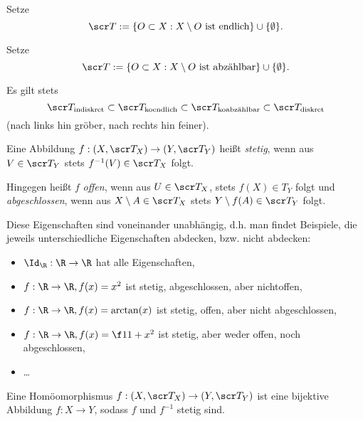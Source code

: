 \begin{ex}
	Setze
	\[
		\scr T
		:= \{ O \subset X : X \setminus O \text{ ist endlich} \} \cup \{\emptyset\}.
	\]
\end{ex}

\begin{ex}
	Setze
	\[
		\scr T
		:= \{ O \subset X : X \setminus O \text{ ist abzählbar} \} \cup \{ \emptyset \}.
	\]
\end{ex}

\begin{nt}
	Es gilt stets
	\[
		\scr T_{\text{indiskret}}
		\subset \scr T_{\text{koendlich}}
		\subset \scr T_{\text{koabzählbar}}
		\subset \scr T_{\text{diskret}}
	\]
	(nach links hin gröber, nach rechts hin feiner).
\end{nt}

\begin{df}
	Eine Abbildung $f: (X,\scr T_X) \to (Y, \scr T_Y)$ heißt \emph{stetig}, wenn aus $V \in \scr T_Y$ stets $f^{-1}(V) \in \scr T_X$ folgt.

	Hingegen heißt $f$ \emph{offen}, wenn aus $U \in \scr T_X$, stets $f(X) \in T_Y$ folgt und \emph{abgeschlossen}, wenn aus $X \setminus A \in \scr T_X$ stets $Y \setminus f(A) \in \scr T_Y$ folgt.
	\begin{note}
		Diese Eigenschaften sind voneinander unabhängig, d.h. man findet Beispiele, die jeweils unterschiedliche Eigenschaften abdecken, bzw. nicht abdecken:
		\begin{itemize}
			\item
				$\Id_\R: \R \to \R$ hat alle Eigenschaften,
			\item
				$f: \R \to \R, f(x) = x^2$ ist stetig, abgeschlossen, aber nichtoffen,
			\item
				$f: \R \to \R, f(x) = \arctan(x)$ ist stetig, offen, aber nicht abgeschlossen,
			\item
				$f: \R \to \R, f(x) = \f 1{1+x^2}$ ist stetig, aber weder offen, noch abgeschlossen,
			\item
				\dots
		\end{itemize}
	\end{note}
\end{df}

\begin{df}
	Eine Homöomorphismus $f: (X,\scr T_X) \to (Y, \scr T_Y)$ ist eine bijektive Abbildung $f: X \to Y$, sodass $f$ und $f^{-1}$ stetig sind.
\end{df}

